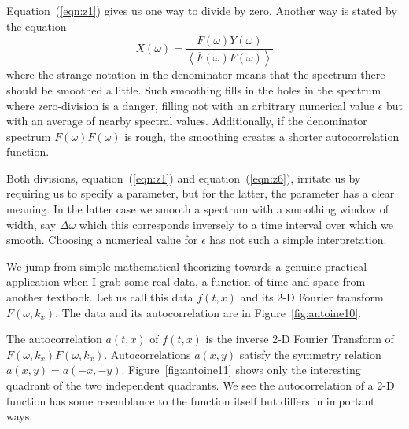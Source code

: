 \par
Equation~(\ref{eqn:z1}) gives us one way to divide by zero.
Another way is stated by the equation
\begin{equation}
X(\omega) = \frac{ \overline{F}(\omega) Y(\omega) }
{\left<
\overline{F}(\omega)  F(\omega)
\right> }
\label{eqn:z6}
\end{equation}
where the strange notation in the denominator means
that the spectrum there should be smoothed a little.
Such smoothing fills in the holes in the spectrum
where zero-division is a danger,
filling not with an arbitrary numerical value $\epsilon$
but with an average of nearby spectral values.
Additionally, if the denominator spectrum
$\overline{F}(\omega) F(\omega)$ is rough,
the smoothing creates a shorter autocorrelation function.
\par
Both divisions,
equation~(\ref{eqn:z1}) and
equation~(\ref{eqn:z6}),
irritate us by requiring us to specify a parameter,
but for the latter, the parameter has a clear meaning.
In the latter case we smooth a spectrum with a smoothing
window of width, say $\Delta\omega$
which this corresponds inversely to a time interval over which we smooth.
Choosing a numerical value for  $\epsilon$ has not such a simple interpretation.


\par
We jump from simple mathematical theorizing
towards a genuine practical application when I grab some real data,
a function of time and space from another textbook.
Let us call this data $f(t,x)$ and its 2-D Fourier transform
$F(\omega, k_x)$.
The data and its autocorrelation are in Figure~\ref{fig:antoine10}.
\par
The autocorrelation $a(t,x)$ of $f(t,x)$ is
the inverse 2-D Fourier Transform  of 
$\overline{F}(\omega, k_x) F(\omega, k_x)$.
Autocorrelations $a(x,y)$
satisfy the symmetry relation
$a(x,y)=a(-x,-y)$.
Figure~\ref{fig:antoine11}
shows only the interesting quadrant of the two independent quadrants.
We see the autocorrelation of a 2-D function has some
resemblance to the function itself but differs in important ways.

